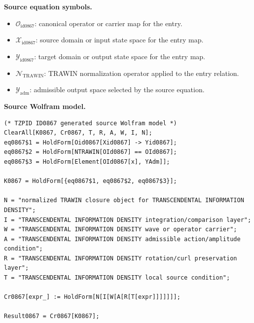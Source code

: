 \begin{minipage}[t]{0.49\linewidth}
\begingroup
\small
\raggedright
\textbf{Source equation symbols.}\par
\begin{itemize}[leftmargin=1.35em,itemsep=1pt,topsep=1pt,parsep=0pt]
    \item $\mathcal{O}_{\mathrm{id0867}}$: canonical operator or carrier map for the entry.
    \item $\mathcal{X}_{\mathrm{id0867}}$: source domain or input state space for the entry map.
    \item $\mathcal{Y}_{\mathrm{id0867}}$: target domain or output state space for the entry map.
    \item $\mathcal{N}_{\mathrm{TRAWIN}}$: TRAWIN normalization operator applied to the entry relation.
    \item $\mathcal{Y}_{\mathrm{adm}}$: admissible output space selected by the source equation.
\end{itemize}
\endgroup
\end{minipage}\hfill
\begin{minipage}[t]{0.47\linewidth}
\begingroup
\scriptsize
\raggedright
\textbf{Source Wolfram model.}\par
\begin{Verbatim}[fontsize=\tiny,breaklines=true,breakanywhere=true]
(* TZPID ID0867 generated source Wolfram model *)
ClearAll[K0867, Cr0867, T, R, A, W, I, N];
eq0867$1 = HoldForm[Oid0867[Xid0867] -> Yid0867];
eq0867$2 = HoldForm[NTRAWIN[OId0867] == OId0867];
eq0867$3 = HoldForm[Element[OId0867[x], YAdm]];

K0867 = HoldForm[{eq0867$1, eq0867$2, eq0867$3}];

N = "normalized TRAWIN closure object for TRANSCENDENTAL INFORMATION DENSITY";
I = "TRANSCENDENTAL INFORMATION DENSITY integration/comparison layer";
W = "TRANSCENDENTAL INFORMATION DENSITY wave or operator carrier";
A = "TRANSCENDENTAL INFORMATION DENSITY admissible action/amplitude condition";
R = "TRANSCENDENTAL INFORMATION DENSITY rotation/curl preservation layer";
T = "TRANSCENDENTAL INFORMATION DENSITY local source condition";

Cr0867[expr_] := HoldForm[N[I[W[A[R[T[expr]]]]]]];

Result0867 = Cr0867[K0867];
\end{Verbatim}
\endgroup
\end{minipage}

